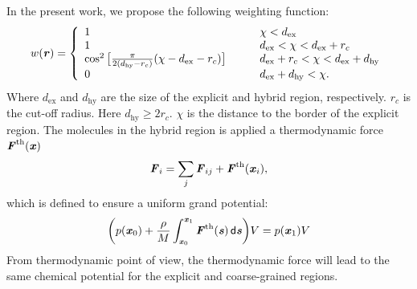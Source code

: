 \documentclass[aps,pre,preprint,unsortedaddress]{revtex4}
\renewcommand{\v}[1]{\textbf{\textit{#1}}}
\renewcommand{\d}[1]{\textsf{#1}}
\begin{document}
In the present work, we propose the following weighting function:
\begin{align}\label{eqn:new-w}
  w(\v r) =
  \left\{
    \begin{array}{lcl}
      1 &\quad& \chi < d_{\textrm{ex}}\\
      1  && d_{\textrm{ex}} < \chi < d_{\textrm{ex}} + r_c\\
      \cos^2\big[\frac{\pi}{2(d_{\textrm{hy}} - r_c)} (\chi - d_{\textrm{ex}} - r_c)\big] && d_{\textrm{ex}} + r_c < \chi < d_{\textrm{ex}} + d_{\textrm{hy}} \\
      0 && d_{\textrm{ex}} + d_{\textrm{hy}}  < \chi.
    \end{array}
  \right.
\end{align}
Where $d_{\textrm{ex}}$ and $d_{\textrm{hy}}$ are the size of the
explicit and hybrid region, respectively. $r_c$ is the cut-off
radius. Here $d_{\textrm{hy}} \geq 2r_c$. $\chi$ is the distance to
the border of the explicit region.  The molecules in the hybrid region
is applied a thermodynamic force $\v F^{\textrm{th}}(\v x)$
\begin{align}
  \v F_i = \sum_j\v F_{ij} + \v F^{\textrm{th}}(\v x_i),
\end{align}
which is defined to ensure a uniform grand potential:
\begin{align}
  \bigg(
  p(\v x_0) +
  \frac{\rho}{M}\int_{\v x_0}^{\v x_1}\v F^{\textrm{th}}(\v s)\,\d d\v s
  \bigg) V
  =
  p(\v x_1) V
\end{align}
From thermodynamic point of view, the thermodynamic force will lead
to the same chemical potential for the explicit and coarse-grained regions.
\end{document}
